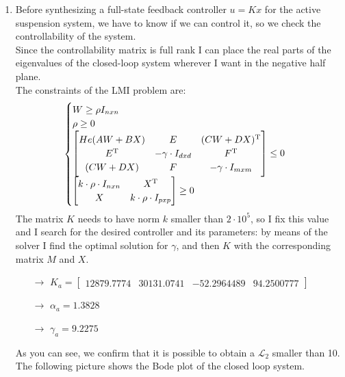 \documentclass[11pt,a4paper]{article}
\begin{document}
\begin{enumerate}
	\item Before synthesizing a full-state feedback controller $u=Kx$ for the active suspension system, we have to know if we can control it, so we check the controllability of the system. \\
	Since the controllability matrix is full rank I can place the real parts of the eigenvalues of the closed-loop system wherever I want in the negative half plane. \\ 
	The constraints of the LMI problem are:
	\begin{equation}
	\begin{cases}
	W \ge \rho I_{nxn} \\ \rho \ge 0 \\
	\begin{bmatrix}
	He(AW+BX) & E & (CW+DX)\textsuperscript{T} \\
	E\textsuperscript{T} &   -\gamma \cdot I_{dxd}  & F\textsuperscript{T}  \\
	(CW+DX) & F & -\gamma \cdot I_{mxm}
	\end{bmatrix} \leq 0\\
	
	\begin{bmatrix}
	k \cdot \rho \cdot I_{nxn} &      X\textsuperscript{T} \\
	X &        k\cdot \rho \cdot I_{pxp} 
	\end{bmatrix} \ge 0
	\end{cases}  
	\end{equation}
	The matrix $K$ needs to have norm $k$ smaller than $2\cdot10^5$, so I fix this value and I search for the desired controller and its parameters: by means of the solver I find the optimal solution for $\gamma$, and then $K$ with the corresponding matrix $M$ and $X$.
	
	\begin{itemize}
		\item[$\rightarrow$] $K_a= \begin{bmatrix} 12879.7774 & 30131.0741 & -52.2964489 & 94.2500777 \end{bmatrix}$
		\item[$\rightarrow$] $\alpha_a=1.3828$
		\item[$\rightarrow$] $\gamma_a=9.2275$
		
	\end{itemize}	

	As you can see, we confirm that it is possible to obtain a $\mathcal{L}_2$ smaller than 10. The following picture shows the Bode plot of the closed loop system.
	

\end{enumerate}
\end{document}
